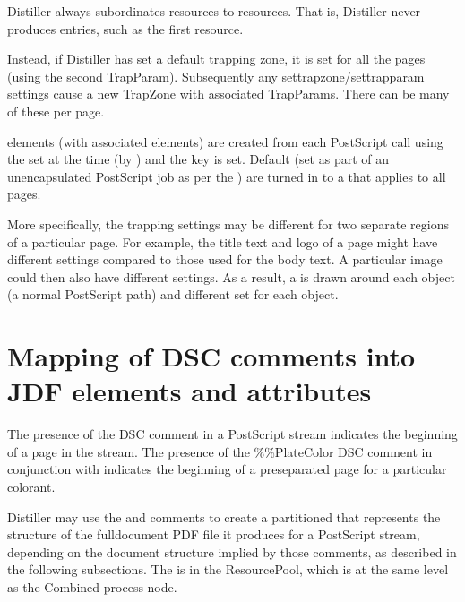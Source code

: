 \documentclass[letterpaper,12pt,english,openany,oneside]{sphinxmanual}
\begin{document}
Distiller always subordinates  resources to  resources. That is, Distiller never produces entries, such as the first  resource.

Instead, if Distiller has set a default trapping zone, it is set for all the pages (using the second TrapParam). Subsequently any settrapzone/settrapparam settings cause a new TrapZone with associated TrapParams. There can be many of these per page.

 elements (with associated  elements) are created from each  PostScript call using the  set at the time (by  ) and the  key is set. Default  (set as part of an unencapsulated PostScript job as per the  ) are turned in to a  that applies to all pages.

More specifically, the trapping settings may be different for two separate regions of a particular page. For example, the title text and logo of a page might have different settings compared to those used for the body text. A particular image could then also have different settings. As a result, a  is drawn around each object (a normal PostScript path) and different  set for each object.




\section{Mapping of DSC comments into JDF elements and attributes}
\label{\detokenize{PDF_Create_JDF:mapping-of-dsc-comments-into-jdf-elements-and-attributes}}
The presence of the  DSC comment in a PostScript stream indicates the beginning of a page in the stream. The presence of the \%\%PlateColor DSC comment in conjunction with  indicates the beginning of a pre\sphinxhyphen{}separated page for a particular colorant.

Distiller may use the  and  comments to create a partitioned  that represents the structure of the full\sphinxhyphen{}document PDF file it produces for a PostScript stream, depending on the document structure implied by those comments, as described in the following subsections. The  is in the ResourcePool, which is at the same level as the Combined process node.
\end{document}

